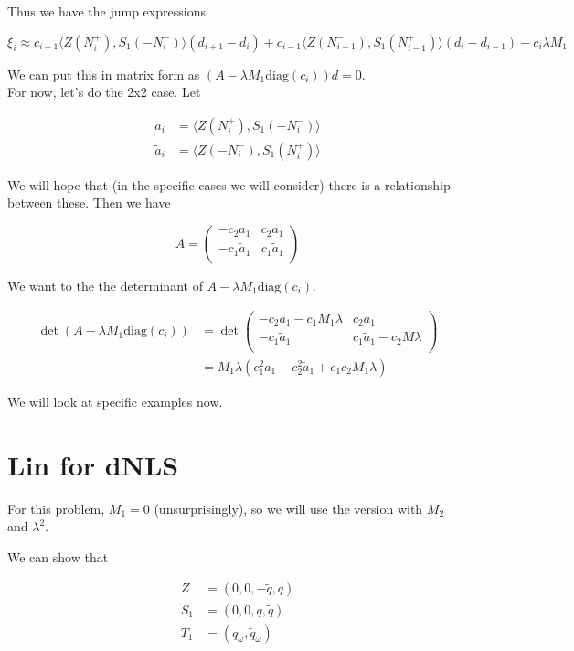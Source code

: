 \documentclass[12pt]{article}
\begin{document}
Thus we have the jump expressions

\[
\xi_i \approx c_{i+1} \langle Z(N_i^+), S_1(-N_i^-) \rangle (d_{i+1} - d_i)
+ c_{i-1} \langle Z(N_{i-1}^-), S_1(N_{i-1}^+) \rangle (d_i - d_{i-1}) - c_i \lambda M_1
\]

We can put this in matrix form as $(A - \lambda M_1 \text{diag}(c_i))d = 0$.\\

For now, let's do the 2x2 case. Let

\begin{align*}
a_i &= \langle Z(N_i^+), S_1(-N_i^-) \rangle \\
\tilde{a}_i &= \langle Z(-N_i^-), S_1(N_i^+) \rangle
\end{align*}

We will hope that (in the specific cases we will consider) there is a relationship between these. Then we have 

\[
A = \begin{pmatrix}
-c_2 a_1 & c_2 a_1 \\
-c_1 \tilde{a}_1 & c_1 \tilde{a}_1 \\
\end{pmatrix}
\]

We want to the the determinant of $A - \lambda M_1 \text{diag}(c_i)$.

\begin{align*}
\det( A - \lambda M_1 \text{diag}(c_i)) &= \det \begin{pmatrix}
-c_2 a_1 - c_1 M_1 \lambda & c_2 a_1 \\
-c_1 \tilde{a}_1 & c_1 \tilde{a}_1 - c_2 M \lambda \\
\end{pmatrix} \\
&= M_1 \lambda ( c_1^2 a_1 - c_2^2 \tilde{a}_1 + c_1 c_2 M_1 \lambda )
\end{align*}

We will look at specific examples now.


\section*{Lin for dNLS}

For this problem, $M_1 = 0$ (unsurprisingly), so we will use the version with $M_2$ and $\lambda^2$.

We can show that

\begin{align*}
Z &= (0, 0, -\tilde{q}, q) \\
S_1 &= (0, 0, q, \tilde{q}) \\
T_1 &= (q_\omega, \tilde{q}_\omega)
\end{align*}
\end{document}
